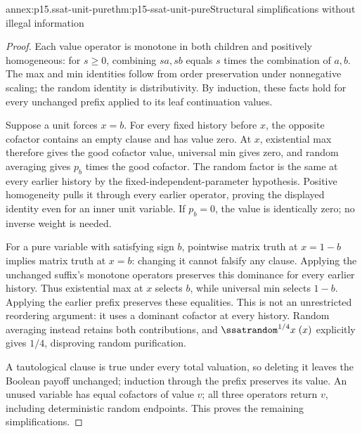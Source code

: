 \begin{annexitem}{annex:p15.ssat-unit-pure}{thm:p15-ssat-unit-pure}{Structural simplifications without illegal information}
\begin{proof}
Each value operator is monotone in both children and positively
homogeneous: for \(s\geq0\), combining \(sa,sb\) equals
\(s\) times the combination of \(a,b\). The max and min identities
follow from order preservation under nonnegative scaling; the random
identity is distributivity. By induction, these facts hold for every
unchanged prefix applied to its leaf continuation values.

Suppose a unit forces \(x=b\). For every fixed history before
\(x\), the opposite cofactor contains an empty clause and has
value zero. At \(x\), existential max therefore gives the good
cofactor value, universal min gives zero, and random averaging gives
\(p_b\) times the good cofactor. The random factor is the same
at every earlier history by the fixed-independent-parameter hypothesis.
Positive homogeneity pulls it through every earlier operator, proving
the displayed identity even for an inner unit variable. If \(p_b=0\),
the value is identically zero; no inverse weight is needed.

For a pure variable with satisfying sign \(b\), pointwise matrix
truth at \(x=1-b\) implies matrix truth at \(x=b\): changing
it cannot falsify any clause. Applying the unchanged suffix's monotone
operators preserves this dominance for every earlier history. Thus
existential max at \(x\) selects \(b\), while universal min
selects \(1-b\). Applying the earlier prefix preserves these
equalities. This is not an unrestricted reordering argument: it uses
a dominant cofactor at every history. Random averaging instead retains
both contributions, and \(\ssatrandom^{1/4}x\;(x)\) explicitly
gives \(1/4\), disproving random purification.

A tautological clause is true under every total valuation, so deleting
it leaves the Boolean payoff unchanged; induction through the prefix
preserves its value. An unused variable has equal cofactors of value
\(v\); all three operators return \(v\), including deterministic
random endpoints. This proves the remaining simplifications.
\end{proof}
\end{annexitem}

